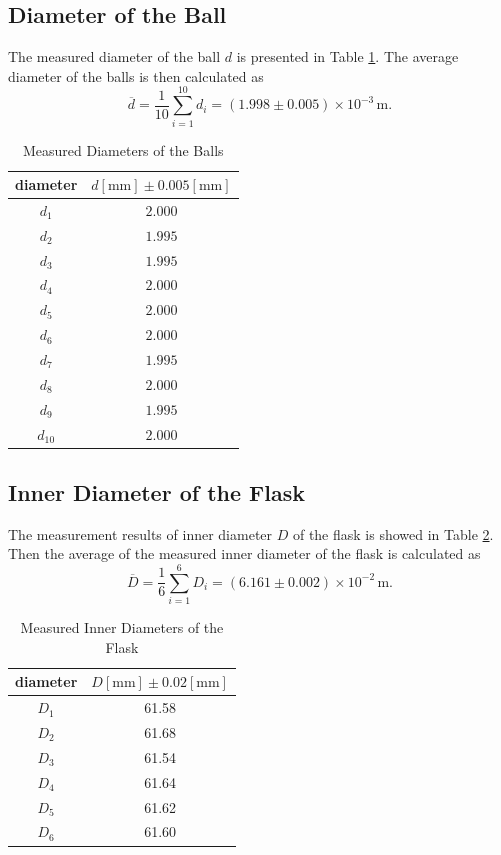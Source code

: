 \documentclass[a4paper]{article}
\begin{document}
	\subsection{Diameter of the Ball}
The measured diameter of the ball $d$ is presented in Table \ref{Tab.diameterball}. The average diameter of the balls is then calculated as
\[\overline{d} = \frac{1}{10} \sum \limits_{i=1}^{10} d_i = (1.998 \pm 0.005) \times 10^{-3} \,\text{m}.\]
\begin{table}[htbp]
\centering
\begin{tabular}{cc}
\toprule
diameter & $d [\text{mm}] \pm 0.005 [\text{mm}]$\\
\midrule
$d_1$ & $2.000$\\
$d_2$ & $1.995$\\
$d_3$ & $1.995$\\
$d_4$ & $2.000$\\
$d_5$ & $2.000$\\
$d_6$ & $2.000$\\
$d_7$ & $1.995$\\
$d_8$ & $2.000$\\
$d_9$ & $1.995$\\
$d_{10}$ & $2.000$\\
\bottomrule
\end{tabular}
\caption{Measured Diameters of the Balls}\label{Tab.diameterball}
\end{table}



	\subsection{Inner Diameter of the Flask}
The measurement results of inner diameter $D$ of the flask is showed in Table \ref{Tab.diameterflask}. Then the average of the measured inner diameter of the flask is calculated as
\[\overline{D} = \frac{1}{6} \sum \limits_{i=1}^{6} D_i = (6.161 \pm 0.002)\times 10^{-2}\,\text{m}.\]

\begin{table}[htbp]
\centering
\begin{tabular}{cc}
\toprule
diameter & $D [\text{mm}] \pm 0.02 [\text{mm}]$\\
\midrule
$D_1$ & 61.58\\
$D_2$ & 61.68\\
$D_3$ & 61.54\\
$D_4$ & 61.64\\
$D_5$ & 61.62\\
$D_6$ & 61.60\\
\bottomrule
\end{tabular}
\caption{Measured Inner Diameters of the Flask\label{Tab.diameterflask}}
\end{table}
\end{document}
